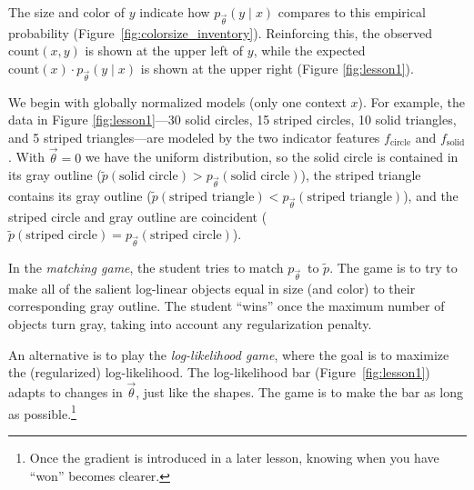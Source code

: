 \documentclass[11pt,letterpaper]{article}
\newcommand{\Note}[1]{}
\renewcommand{\Note}[1]{\hl{[#1]}}  %
\newcommand{\NoteSigned}[3]{{\sethlcolor{#2}\Note{#1: #3}}}
\newcommand{\NoteFF}[1]{\NoteSigned{FF}{LightBlue}{#1}}
\newcommand{\empirical}[0]{\ensuremath{\tilde{p}}}
\begin{document}
The size and color of $y$ indicate how $p_{\vec{\theta}}(y\mid x)$ compares to 
this empirical probability (Figure~\ref{fig:colorsize_inventory}).  
Reinforcing this, the observed $\text{count}(x,y)$ is shown at the upper
left of $y$, while the expected $\text{count}(x)\cdot
p_{\vec{\theta}}(y\mid x)$ is shown at the upper right (Figure
\ref{fig:lesson1}).

We begin with globally normalized models (only one 
context $x$).  For example, the data in Figure \ref{fig:lesson1}---30 solid
circles, 15 striped circles, 10 solid triangles, and 5 striped
triangles---are modeled by the two indicator features
$f_{\textrm{circle}}$ and $f_{\textrm{solid}}$. With $\vec{\theta} =
0$ we have the uniform distribution, so the solid circle is contained
in its gray outline ($\empirical{}(\textrm{solid circle}) >
p_{\vec{\theta}}(\textrm{solid circle})$), the striped triangle
contains its gray outline ($\empirical{}(\textrm{striped triangle}) <
p_{\vec{\theta}}(\textrm{striped triangle})$), and the striped
circle and gray outline are coincident ($\empirical{}(\textrm{striped
  circle}) = p_{\vec{\theta}}(\textrm{striped circle})$).%

In the \textit{matching game}, the student tries to match $p_{\vec{\theta}}$\ to  $\tilde{p}$. 
The game is to try to make all of the salient log-linear objects 
equal in size (and color) to their corresponding gray outline. 
The student ``wins'' once the maximum number of objects turn gray, 
taking into account any regularization penalty.

An alternative is to play the \textit{log-likelihood game}, where the goal is to
maximize the (regularized) log-likelihood. The log-likelihood
bar (Figure~\ref{fig:lesson1}) adapts to changes in $\vec{\theta}$,
just like the shapes. The game is to make the bar as 
long as possible.\footnote{Once the gradient is introduced in a later lesson, knowing when you have ``won'' becomes clearer.}
\end{document}
